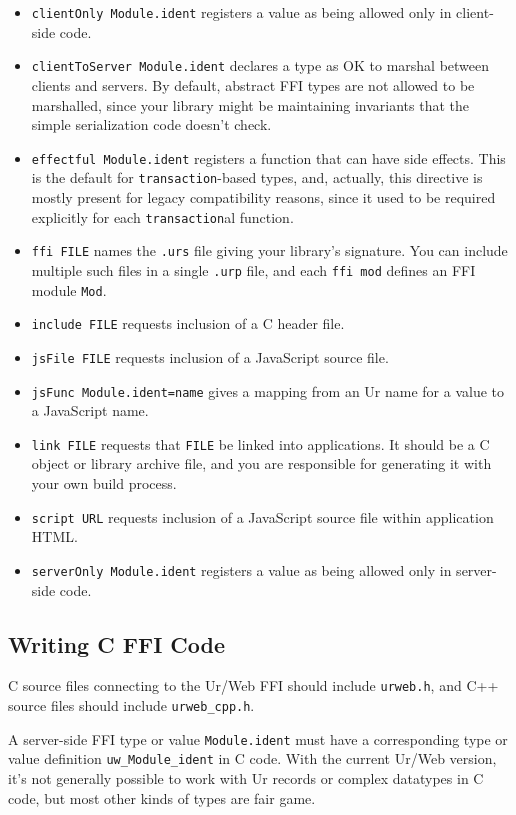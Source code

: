 \documentclass{article}
\begin{document}
\begin{itemize}
\item \texttt{clientOnly Module.ident} registers a value as being allowed only in client-side code.
\item \texttt{clientToServer Module.ident} declares a type as OK to marshal between clients and servers.  By default, abstract FFI types are not allowed to be marshalled, since your library might be maintaining invariants that the simple serialization code doesn't check.
\item \texttt{effectful Module.ident} registers a function that can have side effects.  This is the default for \texttt{transaction}-based types, and, actually, this directive is mostly present for legacy compatibility reasons, since it used to be required explicitly for each \texttt{transaction}al function.
\item \texttt{ffi FILE} names the \texttt{.urs} file giving your library's signature.  You can include multiple such files in a single \texttt{.urp} file, and each \texttt{ffi mod} defines an FFI module \texttt{Mod}.
\item \texttt{include FILE} requests inclusion of a C header file.
\item \texttt{jsFile FILE} requests inclusion of a JavaScript source file.
\item \texttt{jsFunc Module.ident=name} gives a mapping from an Ur name for a value to a JavaScript name.
\item \texttt{link FILE} requests that \texttt{FILE} be linked into applications.  It should be a C object or library archive file, and you are responsible for generating it with your own build process.
\item \texttt{script URL} requests inclusion of a JavaScript source file within application HTML.
\item \texttt{serverOnly Module.ident} registers a value as being allowed only in server-side code.
\end{itemize}

\subsection{Writing C FFI Code}

C source files connecting to the Ur/Web FFI should include \texttt{urweb.h}, and C++ source files should include \texttt{urweb\_cpp.h}.

A server-side FFI type or value \texttt{Module.ident} must have a corresponding type or value definition \texttt{uw\_Module\_ident} in C code.  With the current Ur/Web version, it's not generally possible to work with Ur records or complex datatypes in C code, but most other kinds of types are fair game.
\end{document}
